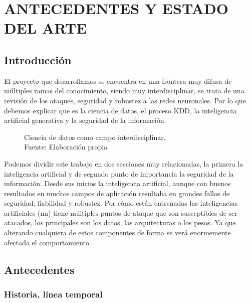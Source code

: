 \chapter{ANTECEDENTES Y ESTADO DEL ARTE}
\label{ch:2}
\section{Introducción}
\label{ch:2:section:introduction}

El proyecto que desarrollamos se encuentra en una frontera muy difusa de múltiples ramas del conocimiento, siendo muy interdisciplinar, se trata de una revisión de los ataques, seguridad y robustez a las redes neuronales.
Por lo que debemos explicar que es la ciencia de datos, el proceso \gls{KDD}, la inteligencia artificial generativa y la seguridad de la información.

\begin{figure}[H]
  \centering
  \centerline{}
  \caption{Ciencia de datos como campo interdisciplinar.\\Fuente: Elaboración propia}
  \label{fig:ciencia-de-datos}
\end{figure}

Podemos dividir este trabajo en dos secciones muy relacionadas, la primera la inteligencia artificial y de segundo punto de importancia la seguridad de la información.
Desde sus inicios la inteligencia artificial, aunque con buenos resultados en muchos campos de aplicación resultaba en grandes fallos de seguridad, fiabilidad y robustez.
Por cómo están entrenadas las inteligencias artificiales (\acrshort{nn}) tiene múltiples puntos de ataque que son susceptibles de ser atacados, los principales son los datos, las arquitecturas o los pesos.
Ya que alterando cualquiera de estos componentes de forma se verá enormemente afectada el comportamiento.



\section{Antecedentes}
\label{ch:2:section:background}

\subsection{Historia, línea temporal}

